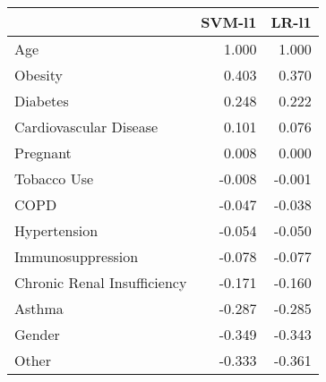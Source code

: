 \begin{tabular}{lrr}
\toprule
{} &  SVM-l1 &  LR-l1 \\
\midrule
Age                         &   1.000 &  1.000 \\
Obesity                     &   0.403 &  0.370 \\
Diabetes                    &   0.248 &  0.222 \\
Cardiovascular Disease      &   0.101 &  0.076 \\
Pregnant                    &   0.008 &  0.000 \\
Tobacco Use                 &  -0.008 & -0.001 \\
COPD                        &  -0.047 & -0.038 \\
Hypertension                &  -0.054 & -0.050 \\
Immunosuppression           &  -0.078 & -0.077 \\
Chronic Renal Insufficiency &  -0.171 & -0.160 \\
Asthma                      &  -0.287 & -0.285 \\
Gender                      &  -0.349 & -0.343 \\
Other                       &  -0.333 & -0.361 \\
\bottomrule
\end{tabular}
